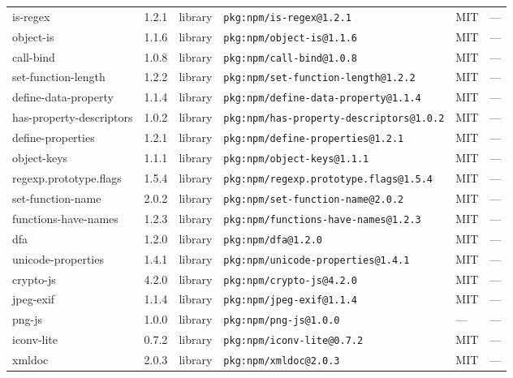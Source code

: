 \documentclass[11pt,a4paper]{article}
\begin{document}
\begin{longtable}{|p{4cm}|p{2cm}|p{1.6cm}|p{5cm}|p{1.5cm}|p{3.5cm}|}
\raggedright is-regex & 1.2.1 & library & \small\texttt{pkg:npm/is-regex@1.2.1} & MIT & \small — \\
\raggedright object-is & 1.1.6 & library & \small\texttt{pkg:npm/object-is@1.1.6} & MIT & \small — \\
\raggedright call-bind & 1.0.8 & library & \small\texttt{pkg:npm/call-bind@1.0.8} & MIT & \small — \\
\raggedright set-function-length & 1.2.2 & library & \small\texttt{pkg:npm/set-function-length@1.2.2} & MIT & \small — \\
\raggedright define-data-property & 1.1.4 & library & \small\texttt{pkg:npm/define-data-property@1.1.4} & MIT & \small — \\
\raggedright has-property-descriptors & 1.0.2 & library & \small\texttt{pkg:npm/has-property-descriptors@1.0.2} & MIT & \small — \\
\raggedright define-properties & 1.2.1 & library & \small\texttt{pkg:npm/define-properties@1.2.1} & MIT & \small — \\
\raggedright object-keys & 1.1.1 & library & \small\texttt{pkg:npm/object-keys@1.1.1} & MIT & \small — \\
\raggedright regexp.prototype.flags & 1.5.4 & library & \small\texttt{pkg:npm/regexp.prototype.flags@1.5.4} & MIT & \small — \\
\raggedright set-function-name & 2.0.2 & library & \small\texttt{pkg:npm/set-function-name@2.0.2} & MIT & \small — \\
\raggedright functions-have-names & 1.2.3 & library & \small\texttt{pkg:npm/functions-have-names@1.2.3} & MIT & \small — \\
\raggedright dfa & 1.2.0 & library & \small\texttt{pkg:npm/dfa@1.2.0} & MIT & \small — \\
\raggedright unicode-properties & 1.4.1 & library & \small\texttt{pkg:npm/unicode-properties@1.4.1} & MIT & \small — \\
\raggedright crypto-js & 4.2.0 & library & \small\texttt{pkg:npm/crypto-js@4.2.0} & MIT & \small — \\
\raggedright jpeg-exif & 1.1.4 & library & \small\texttt{pkg:npm/jpeg-exif@1.1.4} & MIT & \small — \\
\raggedright png-js & 1.0.0 & library & \small\texttt{pkg:npm/png-js@1.0.0} & — & \small — \\
\raggedright iconv-lite & 0.7.2 & library & \small\texttt{pkg:npm/iconv-lite@0.7.2} & MIT & \small — \\
\raggedright xmldoc & 2.0.3 & library & \small\texttt{pkg:npm/xmldoc@2.0.3} & MIT & \small — \\

\end{longtable}
\end{document}
